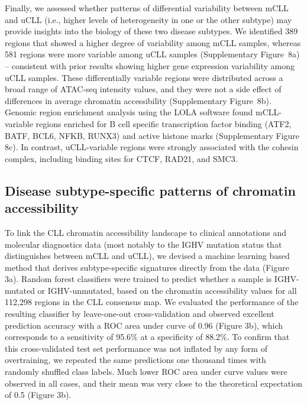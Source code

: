 \documentclass[10pt,]{article}
\begin{document}
Finally, we assessed whether patterns of differential variability
between mCLL and uCLL (i.e., higher levels of heterogeneity in one or
the other subtype) may provide insights into the biology of these two
disease subtypes. We identified 389 regions that showed a higher degree
of variability among mCLL samples, whereas 581 regions were more
variable among uCLL samples (Supplementary Figure~8a) -- consistent with
prior results showing higher gene expression variability among uCLL
samples\citep{Ecker2015}. These differentially variable regions were
distributed across a broad range of ATAC-seq intensity values, and they
were not a side effect of differences in average chromatin accessibility
(Supplementary Figure~8b). Genomic region enrichment analysis using the
LOLA software\citep{Sheffield2015} found mCLL-variable regions enriched
for B cell specific transcription factor binding (ATF2, BATF, BCL6,
NFKB, RUNX3) and active histone marks (Supplementary Figure 8c). In
contrast, uCLL-variable regions were strongly associated with the
cohesin complex, including binding sites for CTCF, RAD21, and SMC3.

\subsection{Disease subtype-specific patterns of chromatin
accessibility}\label{disease-subtype-specific-patterns-of-chromatin-accessibility}

To link the CLL chromatin accessibility landscape to clinical
annotations and molecular diagnostics data (most notably to the IGHV
mutation status that distinguishes between mCLL and uCLL), we devised a
machine learning based method that derives subtype-specific signatures
directly from the data (Figure 3a). Random forest classifiers were
trained to predict whether a sample is IGHV-mutated or IGHV-unmutated,
based on the chromatin accessibility values for all 112,298 regions in
the CLL consensus map. We evaluated the performance of the resulting
classifier by leave-one-out cross-validation and observed excellent
prediction accuracy with a ROC area under curve of 0.96 (Figure 3b),
which corresponds to a sensitivity of 95.6\% at a specificity of 88.2\%.
To confirm that this cross-validated test set performance was not
inflated by any form of overtraining, we repeated the same predictions
one thousand times with randomly shuffled class labels. Much lower ROC
area under curve values were observed in all cases, and their mean was
very close to the theoretical expectation of 0.5 (Figure 3b).
\end{document}
